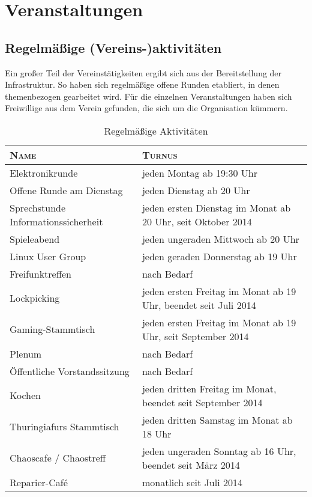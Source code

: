 \documentclass[ngerman]{scrartcl}
\begin{document}
\section{Veranstaltungen}

\subsection{Regelmäßige (Vereins-)aktivitäten}

Ein großer Teil der Vereinstätigkeiten ergibt sich aus der
Bereitstellung der Infrastruktur. So haben sich regelmäßige offene Runden
etabliert, in denen themenbezogen gearbeitet wird. Für die
einzelnen Veranstaltungen haben sich Freiwillige aus dem Verein
gefunden, die sich um die Organisation kümmern.

\begin{table}[h]
  \centering{}
	\begin{tabularx}{\textwidth}{l|X}
          \toprule
		\textsc{Name} & \textsc{Turnus} \\ \midrule
		Elektronikrunde & jeden Montag ab 19:30 Uhr\\
		Offene Runde am Dienstag & jeden Dienstag ab 20 Uhr\\
		Sprechstunde Informationssicherheit & jeden ersten Dienstag im Monat ab 20 Uhr, seit Oktober 2014\\ 
		Spieleabend & jeden ungeraden Mittwoch ab 20 Uhr\\
		Linux User Group & jeden geraden Donnerstag ab 19 Uhr\\
		Freifunktreffen & nach Bedarf\\
		Lockpicking & jeden ersten Freitag im Monat ab 19 Uhr, beendet seit Juli 2014\\
		Gaming-Stammtisch & jeden ersten Freitag im Monat ab 19 Uhr, seit September 2014\\
                Plenum & nach Bedarf\\
		Öffentliche Vorstandssitzung & nach Bedarf\\
		Kochen & jeden dritten Freitag im Monat, beendet seit September 2014\\
		Thuringiafurs Stammtisch & jeden dritten Samstag im Monat ab 18 Uhr\\
		Chaoscafe / Chaostreff & jeden ungeraden Sonntag ab 16 Uhr, beendet seit März 2014\\
		Reparier-Café & monatlich seit Juli 2014\\
\bottomrule
\end{tabularx}
\caption{Regelmäßige Aktivitäten}
\end{table}
\end{document}
